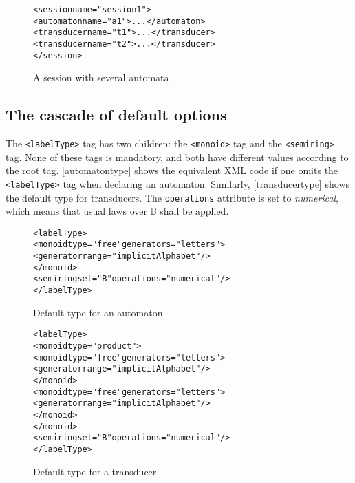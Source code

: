 \documentclass[a4paper]{article}
\newcommand{\xtag}[1]{\texttt{<#1>}}
\newcommand{\xattr}[1]{\texttt{#1}}
\begin{document}
\begin{figure}[htp]
  \small
  \begin{center}
\begin{alltt}
<session name="session1">
  <automaton name="a1">...</automaton>
  <transducer name="t1">...</transducer>
  <transducer name="t2">...</transducer>
</session>
\end{alltt}

\caption{A session with several automata}
\label{session1}
  \end{center}
\end{figure}

\subsection{The cascade of default options}

The \xtag{labelType} tag has two children: the \xtag{monoid} tag and the
\xtag{semiring} tag. None of these tags is mandatory, and both have
different values according to the root tag. \autoref{automatontype}
shows the equivalent XML code if one omits the \xtag{labelType} tag when
declaring an automaton. Similarly, \autoref{transducertype} shows the
default type for transducers.  The \xattr{operations} attribute is
set to \textit{numerical}, which means that usual laws over
$\mathbb{B}$ shall be applied.

\begin{figure}[htp]
  \begin{center}
\begin{alltt}
<labelType>
  <monoid type="free" generators="letters">
     <generator range="implicitAlphabet"/>
  </monoid>
  <semiring set="B" operations="numerical"/>
</labelType>
\end{alltt}

\caption{Default type for an automaton}
\label{automatontype}
  \end{center}
\end{figure}


\begin{figure}[htp]
  \begin{center}
\begin{alltt}
<labelType>
  <monoid type="product">
     <monoid type="free" generators="letters">
       <generator range="implicitAlphabet"/>
     </monoid>
     <monoid type="free" generators="letters">
       <generator range="implicitAlphabet"/>
     </monoid>
  </monoid>
  <semiring set="B" operations="numerical"/>
</labelType>
\end{alltt}

\caption{Default type for a transducer}
\label{transducertype}
  \end{center}
\end{figure}
\end{document}
